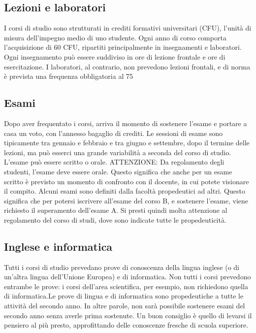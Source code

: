 \subsection{Lezioni e laboratori}
I corsi di studio sono strutturati in crediti formativi universitari (CFU), l'unità di misura dell'impegno medio di uno studente. Ogni anno di corso comporta l'acquisizione di 60 CFU, ripartiti principalmente in insegnamenti e laboratori. Ogni insegnamento può essere suddiviso in ore di lezione frontale e ore di esercitazione. I laboratori, al contrario, non prevedono lezioni frontali, e di norma è prevista una frequenza obbligatoria al 75%

\subsection{Esami} 
Dopo aver frequentato i corsi, arriva il momento di sostenere l'esame e portare a casa un voto, con l'annesso bagaglio di crediti. Le sessioni di esame sono tipicamente tra gennaio e febbraio e tra giugno e settembre, dopo il termine delle lezioni, ma può esserci una grande variabilità a seconda del corso di studio. L'esame può essere scritto o orale. 
ATTENZIONE: Da regolamento degli studenti, l'esame deve essere orale. Questo significa che anche per un esame scritto è previsto un momento di confronto con il docente, in cui potete visionare il compito. 
Alcuni esami sono definiti dalla facoltà propedeutici ad altri. Questo significa che per potersi iscrivere all'esame del corso B, e sostenere l'esame, viene richiesto il superamento dell'esame A. Si presti quindi molta attenzione al regolamento del corso di studi, dove sono indicate tutte le propedeuticità.

\subsection{Inglese e informatica}
Tutti i corsi di studio prevedano prove di conoscenza della lingua inglese (o di un'altra lingua dell'Unione Europea) e di informatica. Non tutti i corsi prevedono entrambe le prove: i corsi dell'area scientifica, per esempio, non richiedono quella di informatica.Le prove di lingua e di informatica sono propedeutiche a tutte le attività del secondo anno. In altre parole, non sarà possibile sostenere esami del secondo anno senza averle prima sostenute. Un buon consiglio è quello di levarsi il pensiero al più presto, approfittando delle conoscenze fresche di scuola superiore. 

